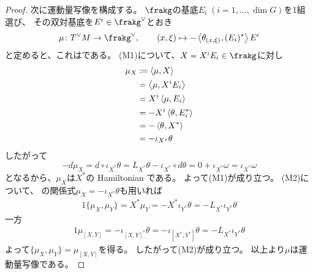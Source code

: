 \documentclass[report,dvipdfmx]{jlreq}
\begin{document}
\begin{proof}
    次に運動量写像を構成する。
    $\frakg$の基底$E_i \; (i = 1, \dots, \dim G)$を1組選び、
    その双対基底を$E^i \in \frakg^\vee$とおき
    \begin{equation}
        \mu \colon T^\vee M \to \frakg^\vee,
            \qquad
            (x, \xi)
                \mapsto
                    - \myangle{\theta_{(x, \xi)}}{(E_i)^*} E^i
    \end{equation}
    と定めると、これは{\smooth}である。
    (M1)について、$X = X^i E_i \in \frakg$に対し
    \begin{alignat}{1}
        \mu_X
            &\coloneqq
                \myangle{\mu}{X}
                \\
            &=
                \myangle{\mu}{X^i E_i}
                \\
            &=
                X^i \myangle{\mu}{E_i}
                \\
            &=
                - X^i \myangle{\theta}{E_i^*}
                \\
            &=
                - \myangle{\theta}{X^*}
                \\
            &=
                - \iota_{X^*} \theta
                \locallabel{eq:1}
    \end{alignat}
    したがって
    \begin{equation}
        - d\mu_X
            =
                d \circ \iota_{X^*} \theta
            =
                L_{X^*} \theta - \iota_{X^*} \circ d\theta
            =
                0 + \iota_{X^*} \omega
            =
                \iota_{X^*} \omega
    \end{equation}
    となるから、$\mu_X$は$X^*$の Hamiltonian である。
    よって(M1)が成り立つ。
    (M2)について、
    の関係式$\mu_X = - \iota_{X^*} \theta$も用いれば
    \begin{alignat}{1}
        \{\mu_X, \mu_Y\}
            =
                X^* \mu_Y
            =
                - X^* \iota_{Y^*} \theta
            =
                - L_{X^*} \iota_{Y^*} \theta
    \end{alignat}
    一方
    \begin{alignat}{1}
        \mu_{[X, Y]}
            =
                - \iota_{[X, Y]^*} \theta
            =
                - \iota_{[X^*, Y^*]} \theta
            =
                - L_{X^*} \iota_{Y^*} \theta
    \end{alignat}
    よって$\{\mu_X, \mu_Y\} = \mu_{[X, Y]}$を得る。
    したがって(M2)が成り立つ。
    以上より$\mu$は運動量写像である。
\end{proof}
\end{document}
